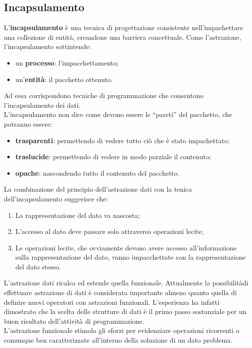 \documentclass[12pt]{report}
\begin{document}
	\subsection{Incapsulamento}
	L'\textbf{incapsulamento} è una tecnica di progettazione consistente nell'impachettare una collezione di entità, creandone una barriera concettuale. Come l'astrazione, l'incapsulamento sottintende:
	\begin{itemize}
		\item un \textbf{processo}: l'impacchettamento;
		\item un'\textbf{entità}: il pacchetto ottenuto.
	\end{itemize}
	Ad essa corrispondono tecniche di programmazione che consentono l'incapsulamento dei dati. \\
	L'incapsulamento non dice come devono essere le ``pareti'' del pacchetto, che potranno essere:
	\begin{itemize}
		\item \textbf{trasparenti}: permettendo di vedere tutto ciò che è stato impachettato;
		\item \textbf{traslucide}: permettendo di vedere in modo parziale il contenuto;
		\item \textbf{opache}: nascondendo tutto il contenuto del pacchetto.
	\end{itemize}
	La combinazione del principio dell'astrazione dati con la tenica dell'incapsulamento suggerisce che:
	\begin{enumerate}
		\item La rappresentazione del dato va nascosta;
		\item L'accesso al dato deve passare solo attraverso operazioni lecite;
		\item Le operazioni lecite, che ovviamente devono avere accesso all'informazione sulla rappresentazione del dato, vanno impacchettate con la rappresentazione del dato stesso.
	\end{enumerate}
	L'astrazione dati ricalca ed estende quella funzionale. Attualmente la possibilitàdi effettuare astrazione di dati è considerata importante almeno quanto quella di definire nuovi operatori con astrazioni funzionali. L'esperienza ha infatti dimostrato che la scelta delle strutture di dati è il primo passo sostanziale per un buon risultato dell'attività di programmazione. \\
	L'astrazione funzionale stimola gli sforzi per evidenziare operazioni ricorrenti o comunque ben caratterizzate all'interno della soluzione di un dato problema. \\
\end{document}
